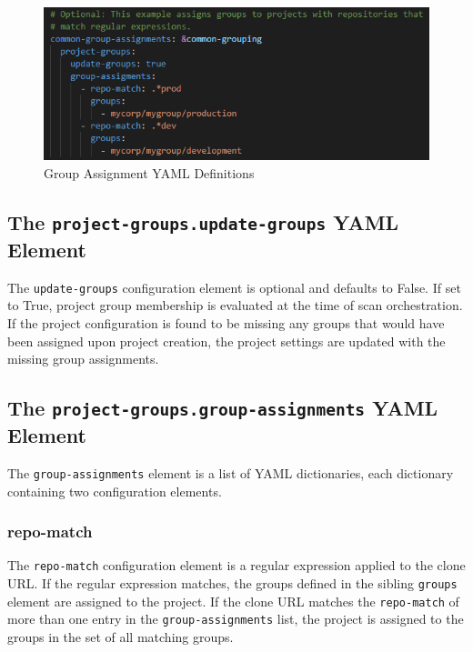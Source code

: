 \begin{figure}[h]
    \includegraphics[width=\textwidth]{graphics/group-yaml.png}
    \caption{Group Assignment YAML Definitions}
    \label{fig:group-yaml}
\end{figure}


\subsection{The \texttt{project-groups.update-groups} YAML Element}

The \texttt{update-groups} configuration element is optional and defaults to False.  If set to True,
project group membership is evaluated at the time of scan orchestration.  If the project configuration
is found to be missing any groups that would have been assigned upon project creation, the project settings
are updated with the missing group assignments.

\subsection{The \texttt{project-groups.group-assignments} YAML Element}

The \texttt{group-assignments} element is a list of YAML dictionaries, each dictionary containing
two configuration elements.

\subsubsection{repo-match}

The \texttt{repo-match} configuration element is a regular expression applied to the clone URL.  If the
regular expression matches, the groups defined in the sibling \texttt{groups} element are assigned
to the project.  If the clone URL matches the \texttt{repo-match} of more than one entry in the
\texttt{group-assignments} list, the project is assigned to the groups in the set of all matching groups.

